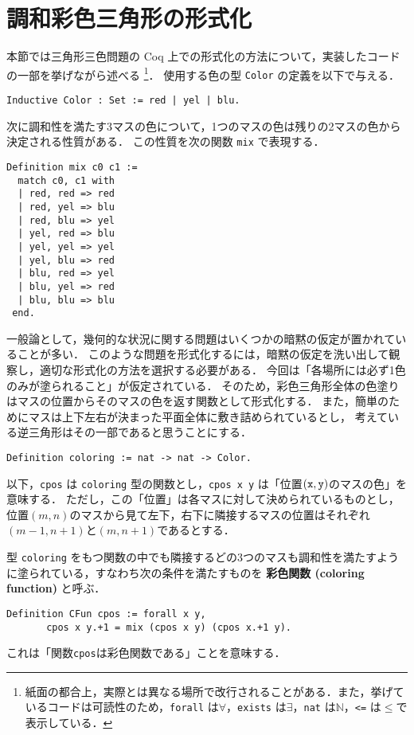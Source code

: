\section{調和彩色三角形の形式化} \label{sec:dfn}

本節では三角形三色問題の Coq 上での形式化の方法について，実装したコードの一部を挙げながら述べる
\footnote{紙面の都合上，実際とは異なる場所で改行されることがある．また，挙げているコードは可読性のため，{\tt forall} は$\forall$，{\tt exists} は$\exists$，{\tt nat} は$\mathbb{N}$，{\tt <=} は$\leq$で表示している．}．
使用する色の型 {\tt Color} の定義を以下で与える．
\begin{lstlisting}[language=Coq]
 Inductive Color : Set := red | yel | blu.
\end{lstlisting}

次に調和性を満たす3マスの色について，1つのマスの色は残りの2マスの色から決定される性質がある．
この性質を次の関数 {\tt mix} で表現する．
\begin{lstlisting}[language=Coq]
 Definition mix c0 c1 :=
  match c0, c1 with
  | red, red => red
  | red, yel => blu
  | red, blu => yel
  | yel, red => blu
  | yel, yel => yel
  | yel, blu => red
  | blu, red => yel
  | blu, yel => red
  | blu, blu => blu
 end.
\end{lstlisting}

一般論として，幾何的な状況に関する問題はいくつかの暗黙の仮定が置かれていることが多い．
このような問題を形式化するには，暗黙の仮定を洗い出して観察し，適切な形式化の方法を選択する必要がある．
今回は「各場所には必ず1色のみが塗られること」が仮定されている．
そのため，彩色三角形全体の色塗りはマスの位置からそのマスの色を返す関数として形式化する．
また，簡単のためにマスは上下左右が決まった平面全体に敷き詰められているとし，
考えている逆三角形はその一部であると思うことにする．
\begin{lstlisting}[language=Coq]
 Definition coloring := nat -> nat -> Color.
\end{lstlisting}
以下，{\tt cpos} は {\tt coloring} 型の関数とし，{\tt cpos x y} は「位置$({\tt x},{\tt y})$のマスの色」を意味する．
ただし，この「位置」は各マスに対して決められているものとし，
位置$(m,n)$のマスから見て左下，右下に隣接するマスの位置はそれぞれ$(m-1,n+1)$と$(m,n+1)$であるとする．

型 {\tt coloring} をもつ関数の中でも隣接するどの3つのマスも調和性を満たすように塗られている，すなわち次の条件を満たすものを {\bf 彩色関数 (coloring function)} と呼ぶ．
\begin{lstlisting}[language=Coq]
 Definition CFun cpos := forall x y,
       cpos x y.+1 = mix (cpos x y) (cpos x.+1 y).
\end{lstlisting}
これは「関数{\tt cpos}は彩色関数である」ことを意味する．

